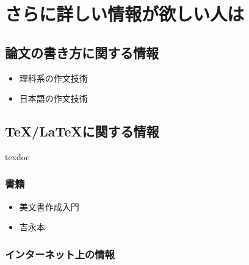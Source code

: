 \chapter{さらに詳しい情報が欲しい人は}
\label{ch:information}



\section{論文の書き方に関する情報}
\label{sec:thesisinfo}

\begin{itemize}
    \item 理科系の作文技術
    \item 日本語の作文技術
\end{itemize}



\section{\TeX/\LaTeX に関する情報}
\label{sec:latexinfo}

texdoc

\subsection{書籍}
\label{ssec:book}

\begin{itemize}
    \item 美文書作成入門
    \item 吉永本
\end{itemize}




\subsection{インターネット上の情報}
\label{sec:internet}



